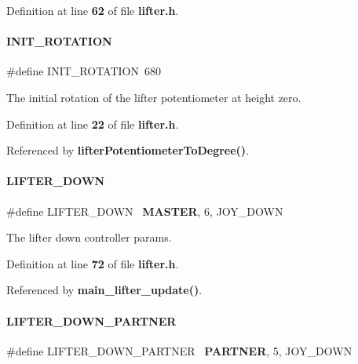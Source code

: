 Definition at line \textbf{ 62} of file \textbf{ lifter.\+h}.

\mbox{\label{a00026_a0685a3cee7d5cabe98d2c9c97bed5727}} 
\paragraph{I\+N\+I\+T\+\_\+\+R\+O\+T\+A\+T\+I\+ON}
{\footnotesize\ttfamily \#define I\+N\+I\+T\+\_\+\+R\+O\+T\+A\+T\+I\+ON~680}



The initial rotation of the lifter potentiometer at height zero. 



Definition at line \textbf{ 22} of file \textbf{ lifter.\+h}.



Referenced by \textbf{ lifter\+Potentiometer\+To\+Degree()}.

\mbox{\label{a00026_a12f8c1de242a92f5694e6b80b990773a}} 
\paragraph{L\+I\+F\+T\+E\+R\+\_\+\+D\+O\+WN}
{\footnotesize\ttfamily \#define L\+I\+F\+T\+E\+R\+\_\+\+D\+O\+WN~\textbf{ M\+A\+S\+T\+ER}, 6, J\+O\+Y\+\_\+\+D\+O\+WN}



The lifter down controller params. 



Definition at line \textbf{ 72} of file \textbf{ lifter.\+h}.



Referenced by \textbf{ main\+\_\+lifter\+\_\+update()}.

\mbox{\label{a00026_a40a0b4dc0172c4133a34d5e3d8b69f9a}} 
\paragraph{L\+I\+F\+T\+E\+R\+\_\+\+D\+O\+W\+N\+\_\+\+P\+A\+R\+T\+N\+ER}
{\footnotesize\ttfamily \#define L\+I\+F\+T\+E\+R\+\_\+\+D\+O\+W\+N\+\_\+\+P\+A\+R\+T\+N\+ER~\textbf{ P\+A\+R\+T\+N\+ER}, 5, J\+O\+Y\+\_\+\+D\+O\+WN}



